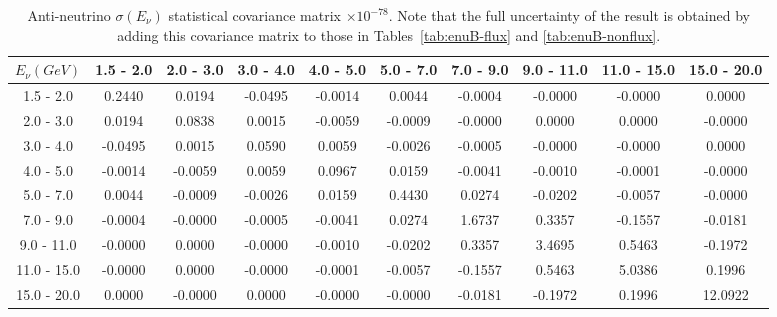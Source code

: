 \documentclass[aps,prl,twocolumn,showpacs,superscriptaddress,nofootinbib]{revtex4}
\begin{document}
\begingroup
\squeezetable
\begin{table}[h]
\tabcolsep=0.11cm
\begin{tabular}{c|ccccccccc}
$E_{\nu}(GeV)$ & 1.5 - 2.0 & 2.0 - 3.0 & 3.0 - 4.0 & 4.0 - 5.0 & 5.0 - 7.0 & 7.0 - 9.0 & 9.0 - 11.0 & 11.0 - 15.0 & 15.0 - 20.0\\
\hline
 1.5 - 2.0 &  0.2440	&0.0194	&-0.0495	&-0.0014	&0.0044	&-0.0004	&-0.0000	&-0.0000&	0.0000	\\
2.0 - 3.0 &0.0194	&0.0838	&0.0015	&-0.0059	&-0.0009	&-0.0000	&0.0000	&0.0000	&-0.0000	\\
3.0 - 4.0 &-0.0495	&0.0015	&0.0590	&0.0059	&-0.0026	&-0.0005	&-0.0000	&-0.0000	&0.0000	\\
 4.0 - 5.0 &-0.0014	&-0.0059	&0.0059	&0.0967	&0.0159	&-0.0041	&-0.0010	&-0.0001	&-0.0000\\	
 5.0 - 7.0 &0.0044	&-0.0009	&-0.0026	&0.0159	&0.4430	&0.0274	&-0.0202	&-0.0057	&-0.0000\\	
7.0 - 9.0 &-0.0004	&-0.0000	&-0.0005	&-0.0041	&0.0274	&1.6737	&0.3357	&-0.1557	&-0.0181\\	
9.0 - 11.0 &-0.0000	&0.0000	&-0.0000	&-0.0010	&-0.0202	&0.3357	&3.4695	&0.5463	&-0.1972	\\
11.0 - 15.0 &-0.0000	&0.0000	&-0.0000	&-0.0001	&-0.0057	&-0.1557	&0.5463	&5.0386	&0.1996	\\
15.0 - 20.0& 0.0000	&-0.0000&	0.0000	&-0.0000	&-0.0000	&-0.0181	&-0.1972	&0.1996	&12.0922	\\
\end{tabular}
\caption{Anti-neutrino $\sigma(E_\nu)$ statistical covariance matrix  $\times 10^{-78}$.  Note that the full uncertainty of the result is obtained by adding this covariance matrix to those in Tables~\ref{tab:enuB-flux} and \ref{tab:enuB-nonflux}. }
\end{table}
\endgroup
\end{document}
